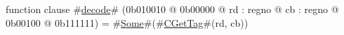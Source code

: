 function clause #\hyperref[zdecode]{decode}# (0b010010 @ 0b00000 @ rd : regno @ cb : regno @    0b00100 @ 0b111111) = #\hyperref[zSome]{Some}#(#\hyperref[zCGetTag]{CGetTag}#(rd, cb))

